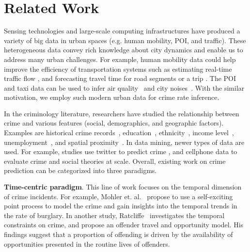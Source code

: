 
\section{Related Work}
\label{ch5-sec:related-work}


Sensing technologies and large-scale computing infrastructures have produced a variety of big data in urban spaces (e.g. human mobility, POI, and traffic). These heterogeneous data convey rich knowledge about city dynamics and enable us to  address many urban challenges. For example, human mobility data could help improve the efficiency of transportation systems such as estimating real-time traffic flow \cite{HHAB10,CCLP+11}, and forecasting travel time for road segments \cite{CJJH09,FLL11,SiZa11} or a trip \cite{TRLM+09,WKKL16}. The POI and taxi data can be used to infer air quality~\cite{ZLH13} and city noises~\cite{ZLWZ+14}. With the similar motivation, we employ such modern urban data for crime rate inference. 


\medskip

In the criminology literature, researchers have studied the relationship between crime and various features (social, demographics, and geographic factors). Examples are historical crime records~\cite{MSBS+12,WRWS13}, education~\cite{Ehrl75}, ethnicity~\cite{Brai89}, income level~\cite{Patt91}, unemployment~\cite{Free99}, and spatial proximity~\cite{Ans02}. 
In data mining, newer types of data are used. For example, studies use twitter to predict crime \cite{WGB12,Gerb14}, and cellphone data \cite{TQC14,Bogo14} to evaluate crime and social theories at scale. Overall, existing work on crime prediction can be categorized into three paradigms.


\smallskip
\textbf{Time-centric paradigm}. This line of work focuses on the temporal dimension of crime incidents. For example, Mohler et. al.~\cite{MSBS+12} propose to use a self-exciting point process to model the crime and gain insights into the temporal trends in the rate of burglary. In another study, Ratcliffe~\cite{Ratc06} investigates the temporal constraints on crime, and propose an offender travel and opportunity model. His findings suggest that a proportion of offending is driven by the availability of opportunities presented in the  routine lives of offenders. 

